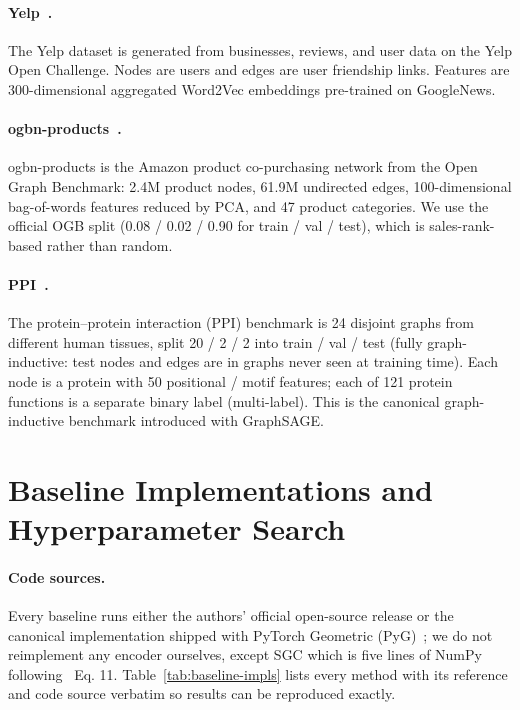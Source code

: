 \documentclass{article}
\begin{document}
\paragraph{Yelp~\citep{zeng2019graphsaint}.}
The Yelp dataset is generated from businesses, reviews, and user data on the
Yelp Open Challenge. Nodes are users and edges are user friendship links.
Features are 300-dimensional aggregated Word2Vec embeddings pre-trained on
GoogleNews.

\paragraph{ogbn-products~\citep{hu2020open}.}
ogbn-products is the Amazon product co-purchasing network from the Open
Graph Benchmark: 2.4M product nodes, 61.9M undirected edges, 100-dimensional
bag-of-words features reduced by PCA, and 47 product categories. We use the
official OGB split (0.08 / 0.02 / 0.90 for train / val / test), which is
sales-rank-based rather than random.

\paragraph{PPI~\citep{hamilton2017inductive}.}
The protein--protein interaction (PPI) benchmark is 24 disjoint graphs from
different human tissues, split 20 / 2 / 2 into train / val / test (fully
graph-inductive: test nodes and edges are in graphs never seen at training
time). Each node is a protein with 50 positional / motif features; each of
121 protein functions is a separate binary label (multi-label). This is the
canonical graph-inductive benchmark introduced with GraphSAGE.

\section{Baseline Implementations and Hyperparameter Search}
\label{app:baselines}

\paragraph{Code sources.}
Every baseline runs either the authors' official open-source release or
the canonical implementation shipped with PyTorch Geometric
(PyG)~\citep{fey2019pyg}; we do not reimplement any encoder ourselves,
except SGC which is five lines of NumPy following~\citet{wu2019simplifying}
Eq. 11. Table~\ref{tab:baseline-impls} lists every method with its
reference and code source verbatim so results can be reproduced exactly.
\end{document}
